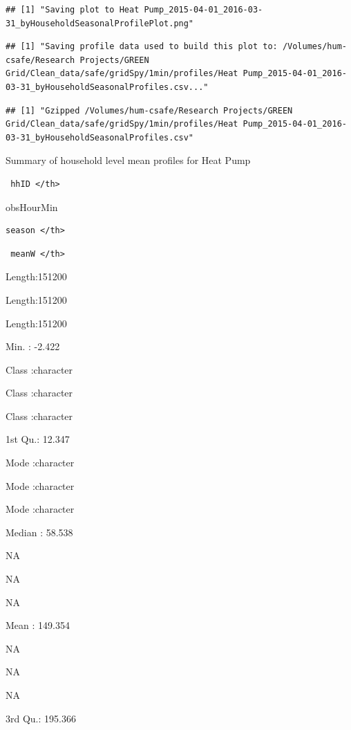 \documentclass[]{article}
\begin{document}
\begin{verbatim}
## [1] "Saving plot to Heat Pump_2015-04-01_2016-03-31_byHouseholdSeasonalProfilePlot.png"
\end{verbatim}

\begin{verbatim}
## [1] "Saving profile data used to build this plot to: /Volumes/hum-csafe/Research Projects/GREEN Grid/Clean_data/safe/gridSpy/1min/profiles/Heat Pump_2015-04-01_2016-03-31_byHouseholdSeasonalProfiles.csv..."
\end{verbatim}

\begin{verbatim}
## [1] "Gzipped /Volumes/hum-csafe/Research Projects/GREEN Grid/Clean_data/safe/gridSpy/1min/profiles/Heat Pump_2015-04-01_2016-03-31_byHouseholdSeasonalProfiles.csv"
\end{verbatim}

Summary of household level mean profiles for Heat Pump

\begin{verbatim}
 hhID </th>
\end{verbatim}

obsHourMin

\begin{verbatim}
season </th>
\end{verbatim}

\begin{verbatim}
 meanW </th>
\end{verbatim}

Length:151200

Length:151200

Length:151200

Min. : -2.422

Class :character

Class :character

Class :character

1st Qu.: 12.347

Mode :character

Mode :character

Mode :character

Median : 58.538

NA

NA

NA

Mean : 149.354

NA

NA

NA

3rd Qu.: 195.366
\end{document}
